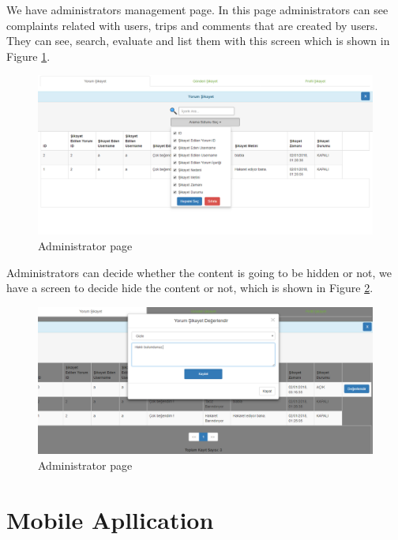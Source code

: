 \newpage

We have administrators management page. In this page administrators can see complaints related with users, trips and comments that are created by users. They can see, search, evaluate and list them with this screen which is shown in Figure \ref{fig:admin1}.
\begin{figure}[!htbp]
\centering
\includegraphics[width=\textwidth]{projectChapters/images/admin1.png}
\caption{Administrator page}
\label{fig:admin1}
\end{figure}

\newpage

Administrators can decide whether the content is going to be hidden or not, we have a screen to decide hide the content or not, which is shown in Figure  \ref{fig:admin2}.

\begin{figure}[!htbp]
\centering
\includegraphics[width=\textwidth]{projectChapters/images/admin2.png}
\caption{Administrator page}
\label{fig:admin2}
\end{figure}

\newpage


\section{Mobile Apllication}

